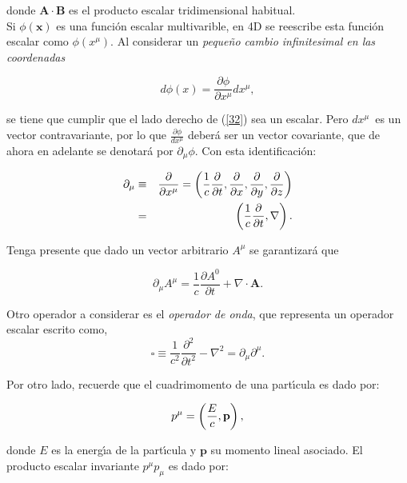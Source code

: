 donde $\mathbf{A}\cdot \mathbf{B}$ es el producto escalar tridimensional
habitual. \\

Si $\phi (\mathbf{x})$ es una funci\'{o}n escalar multivarible, en
4D se reescribe esta funci\'{o}n escalar como $\phi (x^{\mu })$. Al considerar
un \emph{peque\~{n}o cambio infinitesimal en las coordenadas}


\begin{equation}
d\phi (x)=\frac{\partial \phi }{\partial x^{\mu }}dx^{\mu},
\label{32}
\end{equation}

se tiene que cumplir que  el lado derecho de (\ref{32}) sea un escalar. Pero $dx^{\mu }$\ es
un vector contravariante, por lo que $\frac{\partial \phi }{dx^{\mu}}$ deberá ser un vector covariante, que 
de ahora en adelante se denotar\'{a} por $\partial _{\mu }\phi 
$. Con esta identificaci\'{o}n:

\begin{eqnarray}
\partial _{\mu } &\equiv &\frac{\partial }{\partial x^{\mu }}=\left( \frac{1%
}{c}\frac{\partial }{\partial t},\frac{\partial }{\partial x},\frac{\partial 
}{\partial y},\frac{\partial }{\partial z}\right)   \label{33} \\
&=&\left( \frac{1}{c}\frac{\partial }{\partial t},\nabla \right).  \notag
\end{eqnarray}

Tenga presente que dado un vector arbitrario $A^{\mu }$ se garantizará que

\begin{equation}
\partial _{\mu }A^{\mu }=\frac{1}{c}\frac{\partial A^{0}}{\partial t}+\nabla
\cdot \mathbf{A}  \label{34}.
\end{equation}

Otro operador a considerar es el \emph{operador de onda}, que representa un 
operador escalar escrito como,
\begin{equation}
\square \equiv \frac{1}{c^{2}}\frac{\partial ^{2}}{\partial t^{2}}-\nabla
^{2}=\partial _{\mu }\partial ^{\mu}.  \label{35}
\end{equation}

Por otro lado, recuerde que el cuadrimomento de una part\'{\i}cula es dado por:

\begin{equation}
p^{\mu }=\left( \frac{E}{c},\vb{p}\right),  \label{36}
\end{equation}

donde $E$ es la energ\'{\i}a de la part\'{\i}cula y $\textbf{p}$ su momento lineal asociado. El producto escalar
invariante $p^{\mu }p_{\mu }$ es dado por:

